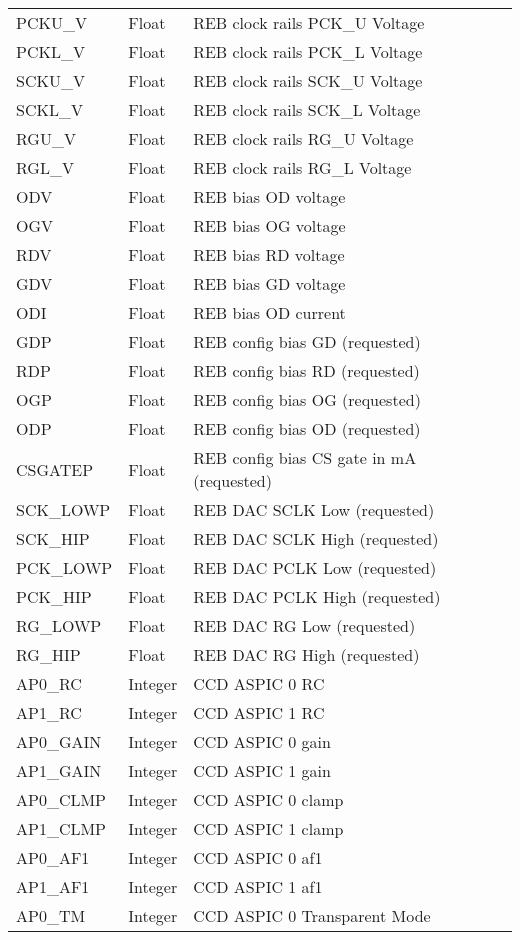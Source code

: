 \begin{longtable}{l l l l l}
PCKU\_V & Float & REB clock rails PCK\_U Voltage \\
PCKL\_V & Float & REB clock rails PCK\_L Voltage \\
SCKU\_V & Float & REB clock rails SCK\_U Voltage \\
SCKL\_V & Float & REB clock rails SCK\_L Voltage \\
RGU\_V & Float & REB clock rails RG\_U Voltage \\
RGL\_V & Float & REB clock rails RG\_L Voltage \\
ODV & Float & REB bias OD voltage \\
OGV & Float & REB bias OG voltage \\
RDV & Float & REB bias RD voltage \\
GDV & Float & REB bias GD voltage \\
ODI & Float & REB bias OD current \\
GDP & Float & REB config bias GD (requested)   \\
RDP & Float & REB config bias RD (requested)   \\
OGP & Float & REB config bias OG (requested)   \\
ODP & Float & REB config bias OD (requested)   \\
CSGATEP & Float & REB config bias CS gate in mA (requested)   \\
SCK\_LOWP & Float & REB DAC SCLK Low (requested) \\
SCK\_HIP & Float & REB DAC SCLK High (requested) \\
PCK\_LOWP & Float & REB DAC PCLK Low (requested) \\
PCK\_HIP & Float & REB DAC PCLK High (requested) \\
RG\_LOWP & Float & REB DAC RG Low (requested) \\
RG\_HIP & Float & REB DAC RG High (requested) \\
AP0\_RC & Integer & CCD ASPIC 0 RC \\
AP1\_RC & Integer & CCD ASPIC 1 RC  \\
AP0\_GAIN & Integer & CCD ASPIC 0 gain \\
AP1\_GAIN & Integer & CCD ASPIC 1 gain \\
AP0\_CLMP & Integer & CCD ASPIC 0 clamp \\
AP1\_CLMP & Integer & CCD ASPIC 1 clamp \\
AP0\_AF1 & Integer & CCD ASPIC 0 af1 \\
AP1\_AF1 & Integer & CCD ASPIC 1 af1 \\
AP0\_TM & Integer & CCD ASPIC 0 Transparent Mode \\

\end{longtable}
